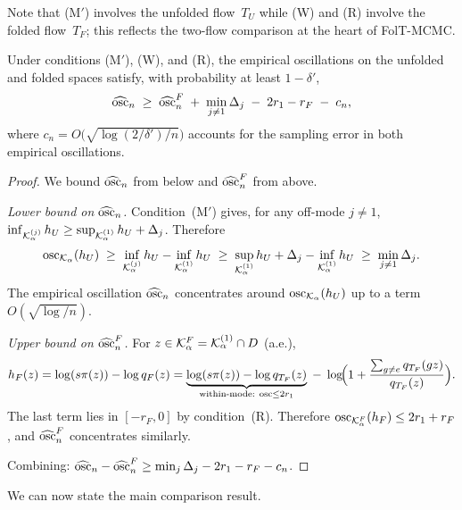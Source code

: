 Note that (M$'$) involves the unfolded flow~$T_U$ while (W) and
(R) involve the folded flow~$T_F$; this reflects the two-flow
comparison at the heart of FolT-MCMC.

\begin{lemma}\label{lem:osc_gap}
  Under conditions \textup{(M$'$)}, \textup{(W)}, and
  \textup{(R)}, the empirical oscillations on the unfolded and
  folded spaces satisfy, with probability at least $1 - \delta'$,
  \begin{equation}\label{eq:osc_gap}
    \widehat{\mathrm{osc}}_n
    \;\geq\;
    \widehat{\mathrm{osc}}_n^F
    \;+\; \min_{j \neq 1} \Delta_j
    \;-\; 2r_1 - r_F
    \;-\; c_n,
  \end{equation}
  where $c_n = O\!\bigl(\sqrt{\log(2/\delta')/n}\bigr)$ accounts for
  the sampling error in both empirical oscillations.
\end{lemma}

\begin{proof}
  We bound $\widehat{\mathrm{osc}}_n$ from below and $\widehat{\mathrm{osc}}_n^F$
  from above.

  \emph{Lower bound on $\widehat{\mathrm{osc}}_n$.}\;
  Condition~(M$'$) gives, for any off-mode $j \neq 1$,
  $\inf_{\mathcal{K}_\alpha^{(j)}} h_U \geq \sup_{\mathcal{K}_\alpha^{(1)}} h_U
  + \Delta_j$.
  Therefore
  \[
    \mathrm{osc}_{\mathcal{K}_\alpha}(h_U)
    \;\geq\;
    \inf_{\mathcal{K}_\alpha^{(j)}} h_U - \inf_{\mathcal{K}_\alpha^{(1)}} h_U
    \;\geq\;
    \sup_{\mathcal{K}_\alpha^{(1)}} h_U + \Delta_j - \inf_{\mathcal{K}_\alpha^{(1)}} h_U
    \;\geq\;
    \min_{j \neq 1}\Delta_j.
  \]
  The empirical oscillation $\widehat{\mathrm{osc}}_n$ concentrates around
  $\mathrm{osc}_{\mathcal{K}_\alpha}(h_U)$ up to a term $O(\sqrt{\log/n})$.

  \emph{Upper bound on $\widehat{\mathrm{osc}}_n^F$.}\;
  For $z \in \mathcal{K}_\alpha^F = \mathcal{K}_\alpha^{(1)} \cap D$ (a.e.),
  \[
    h_F(z) = \log(s\pi(z)) - \log q_F(z)
    = \underbrace{\log(s\pi(z)) - \log q_{T_F}(z)}_{\text{within-mode:
      osc} \leq 2r_1}
    \;-\; \log\!\Bigl(1 + \frac{\sum_{g \neq e} q_{T_F}(gz)}{q_{T_F}(z)}\Bigr).
  \]
  The last term lies in $[-r_F, 0]$ by condition~(R).
  Therefore $\mathrm{osc}_{\mathcal{K}_\alpha^F}(h_F) \leq 2r_1 + r_F$, and
  $\widehat{\mathrm{osc}}_n^F$ concentrates similarly.

  Combining: $\widehat{\mathrm{osc}}_n - \widehat{\mathrm{osc}}_n^F \geq
  \min_j \Delta_j - 2r_1 - r_F - c_n$.
\end{proof}

We can now state the main comparison result.

